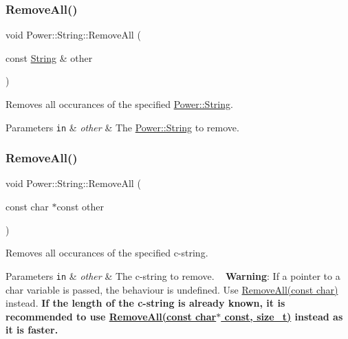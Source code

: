 \subsubsection{\texorpdfstring{Remove\+All()}{RemoveAll()}\hspace{0.1cm}{\footnotesize\ttfamily [1/4]}}
{\footnotesize\ttfamily void Power\+::\+String\+::\+Remove\+All (\begin{DoxyParamCaption}\item[{const \hyperlink{class_power_1_1_string}{String} \&}]{other }\end{DoxyParamCaption})}



Removes all occurances of the specified \hyperlink{class_power_1_1_string}{Power\+::\+String}. 


\begin{DoxyParams}[1]{Parameters}
\mbox{\tt in}  & {\em other} & The \hyperlink{class_power_1_1_string}{Power\+::\+String} to remove. \\
\hline
\end{DoxyParams}
\mbox{\label{class_power_1_1_string_a1b237c81ea2a466c192cdd63e706f455}} 
\subsubsection{\texorpdfstring{Remove\+All()}{RemoveAll()}\hspace{0.1cm}{\footnotesize\ttfamily [2/4]}}
{\footnotesize\ttfamily void Power\+::\+String\+::\+Remove\+All (\begin{DoxyParamCaption}\item[{const char $\ast$const}]{other }\end{DoxyParamCaption})}



Removes all occurances of the specified c-\/string. 


\begin{DoxyParams}[1]{Parameters}
\mbox{\tt in}  & {\em other} & The c-\/string to remove. ~\newline
 {\bfseries Warning}\+: If a pointer to a char variable is passed, the behaviour is undefined. Use \hyperlink{class_power_1_1_string_ac1a456c7f0f019263c424431b0fbeefa}{Remove\+All(const char)} instead.  {\bfseries If the length of the c-\/string is already known, it is recommended to use \hyperlink{class_power_1_1_string_a6418c5e3a28ef177a3516c17be3bfcb3}{Remove\+All(const char$\ast$ const, size\+\_\+t)} instead as it is faster.} \\
\hline
\end{DoxyParams}
\mbox{\label{class_power_1_1_string_a6418c5e3a28ef177a3516c17be3bfcb3}} 
